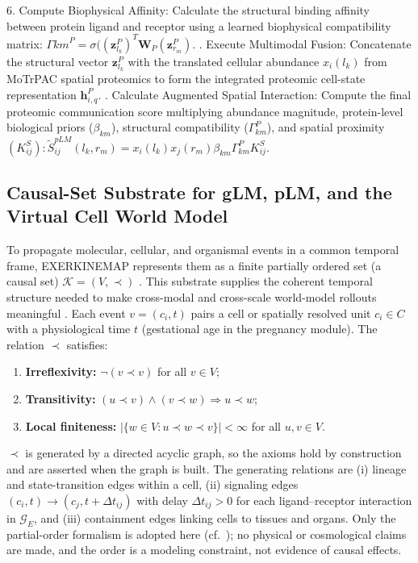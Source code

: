 \documentclass[11pt]{article}
\begin{document}
6. Compute Biophysical Affinity: Calculate the structural binding affinity between protein ligand and receptor using a learned biophysical compatibility matrix: $\Gamma{km}^P = \sigma((\mathbf{z}_{l_k}^P)^T \mathbf{W}_P(\mathbf{z}_{r_m}^P)$. . Execute Multimodal Fusion: Concatenate the structural vector $\mathbf{z}_{l_k}^P$ with the translated cellular abundance $x_i(l_k)$ from MoTrPAC spatial proteomics to form the integrated proteomic cell-state representation $\mathbf{h}_{i,q}^P$. . Calculate Augmented Spatial Interaction: Compute the final proteomic communication score multiplying abundance magnitude, protein-level biological priors ($\beta_{km}$), structural compatibility ($\Gamma_{km}^P$), and spatial proximity $(K_{ij}^S):\widetilde{S}_{ij}^{pLM}(l_k,r_m) = x_i(l_k)x_j(r_m)\beta_{km}\Gamma_{km}^PK_{ij}^S$. \newline

\subsection{Causal-Set Substrate for gLM, pLM, and the Virtual Cell World Model}
\label{sec:causal}
To propagate molecular, cellular, and organismal events in a common temporal frame, EXERKINEMAP represents them as a finite partially ordered set (a causal set) $\mathcal{K}=(V,\prec)$ \cite{bombelli1987}. This substrate supplies the coherent temporal structure needed to make cross-modal and cross-scale world-model rollouts meaningful \cite{xing2026}. Each event $v=(c_i,t)$ pairs a cell or spatially resolved unit $c_i\in C$ with a physiological time $t$ (gestational age in the pregnancy module). The relation $\prec$ satisfies:
\begin{enumerate}
    \item \textbf{Irreflexivity:} $\neg(v\prec v)$ for all $v\in V$;
    \item \textbf{Transitivity:} $(u\prec v)\wedge(v\prec w)\Rightarrow u\prec w$;
    \item \textbf{Local finiteness:} $|\{w\in V : u\prec w\prec v\}|<\infty$ for all $u,v\in V$.
\end{enumerate}
$\prec$ is generated by a directed acyclic graph, so the axioms hold by construction and are asserted when the graph is built. The generating relations are (i) lineage and state-transition edges within a cell, (ii) signaling edges $(c_i,t)\rightarrow(c_j,t+\Delta t_{ij})$ with delay $\Delta t_{ij}>0$ for each ligand--receptor interaction in $\mathcal{G}_E$, and (iii) containment edges linking cells to tissues and organs. Only the partial-order formalism is adopted here (cf.\ \cite{devine2026}); no physical or cosmological claims are made, and the order is a modeling constraint, not evidence of causal effects.
\end{document}
